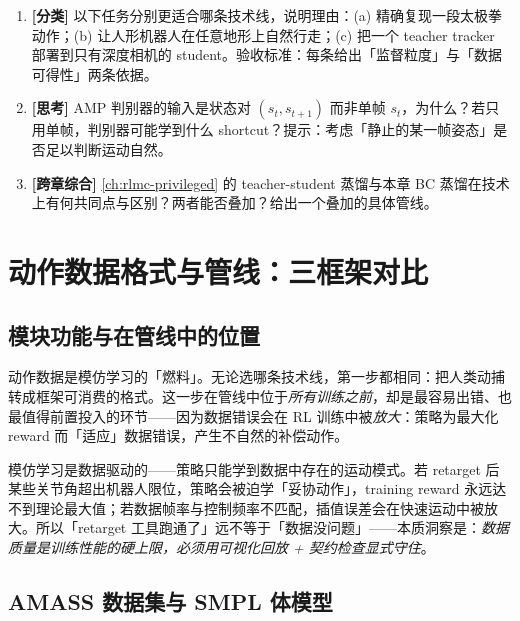 \begin{practice}[练习·三技术线]
\begin{enumerate}
  \item \textbf{[分类]} 以下任务分别更适合哪条技术线，说明理由：(a) 精确复现一段太极拳动作；(b) 让人形机器人在任意地形上自然行走；(c) 把一个 teacher tracker 部署到只有深度相机的 student。验收标准：每条给出「监督粒度」与「数据可得性」两条依据。
  \item \textbf{[思考]} AMP 判别器的输入是状态对 $(s_t,s_{t+1})$ 而非单帧 $s_t$，为什么？若只用单帧，判别器可能学到什么 shortcut？提示：考虑「静止的某一帧姿态」是否足以判断运动自然。
  \item \textbf{[跨章综合]} \cref{ch:rlmc-privileged} 的 teacher-student 蒸馏与本章 BC 蒸馏在技术上有何共同点与区别？两者能否叠加？给出一个叠加的具体管线。
\end{enumerate}
\end{practice}

\section{动作数据格式与管线：三框架对比}
\label{sec:rlmc-imit-data}

\subsection{模块功能与在管线中的位置}
\label{sec:rlmc-imit-data-pos}

动作数据是模仿学习的「燃料」。无论选哪条技术线，第一步都相同：把人类动捕转成框架可消费的格式。这一步在管线中位于\emph{所有训练之前}，却是最容易出错、也最值得前置投入的环节——因为数据错误会在 RL 训练中被\emph{放大}：策略为最大化 reward 而「适应」数据错误，产生不自然的补偿动作。

\begin{insight}\label{ins:rlmc-imit-dataquality}
模仿学习是数据驱动的——策略只能学到数据中存在的运动模式。若 retarget 后某些关节角超出机器人限位，策略会被迫学「妥协动作」，training reward 永远达不到理论最大值；若数据帧率与控制频率不匹配，插值误差会在快速运动中被放大。所以「retarget 工具跑通了」远不等于「数据没问题」——本质洞察是：\emph{数据质量是训练性能的硬上限，必须用可视化回放 + 契约检查显式守住}。
\end{insight}

\subsection{AMASS 数据集与 SMPL 体模型}
\label{sec:rlmc-imit-data-amass}

